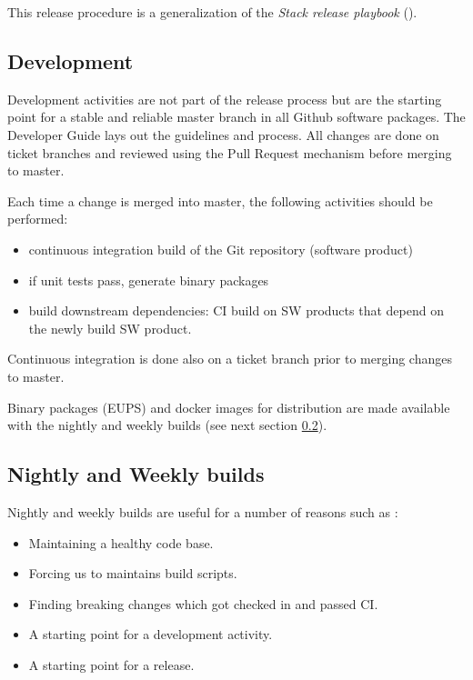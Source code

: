 This release procedure is a generalization of the \textit{Stack release playbook} ().


\subsection{Development} \label{sec:dev}

Development activities are not part of the release process but are the starting point for a stable and reliable master branch in all Github software packages.
The Developer Guide lays out the guidelines and process. All changes are done on ticket branches and reviewed using the Pull Request mechanism before merging to master.

Each time a change is merged into master, the following activities should be performed:

\begin{itemize}
\item continuous integration build of the Git repository (software product)
\item if unit tests pass, generate binary packages
\item build downstream dependencies: CI build on SW products that depend on the newly build SW product.
\end{itemize}

Continuous integration is done also on a ticket branch prior to merging changes to master. 

Binary packages (EUPS) and docker images for distribution are made available with the nightly and weekly builds (see next section \ref{sec:weekly}).


\subsection{Nightly and Weekly builds} \label{sec:weekly}

Nightly and weekly builds are  useful for a number of reasons such as :
\begin{itemize}
	\item Maintaining a healthy code base.
	\item Forcing us to maintains build scripts.
	\item Finding breaking changes which got checked in and passed CI.
	\item A starting point for a development activity.
	\item A starting point for a release.
\end{itemize}

